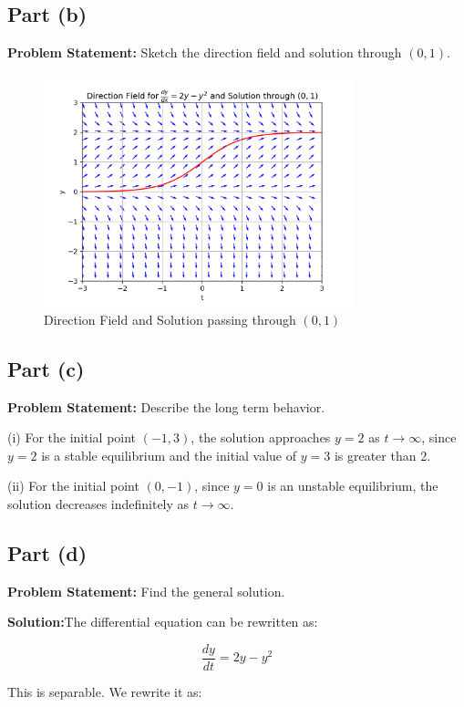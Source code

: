 \documentclass[12pt, letterpaper]{article}
\begin{document}
\subsection*{Part (b)}
\textbf{Problem Statement:} Sketch the direction field and solution through $(0,1)$.
\begin{figure}[h!]
    \centering
    \includegraphics[width=0.8\textwidth]{direction_field_solution.png} %
    \caption{Direction Field and Solution passing through $(0,1)$}
    \label{fig:direction_field}
\end{figure}
\subsection*{Part (c)}
\textbf{Problem Statement:} Describe the long term behavior.

(i) For the initial point \( (-1, 3) \), the solution approaches \( y = 2 \) as \( t \to \infty \), since \( y = 2 \) is a stable equilibrium and the initial value of \( y = 3 \) is greater than 2.

(ii) For the initial point \( (0, -1) \), since \( y = 0 \) is an unstable equilibrium, the solution decreases indefinitely as \( t \to \infty \).

\subsection*{Part (d)}
\textbf{Problem Statement:} Find the general solution.

\textbf{Solution:}The differential equation can be rewritten as:

\[
\frac{dy}{dt} = 2y - y^2
\]

This is separable. We rewrite it as:
\end{document}
